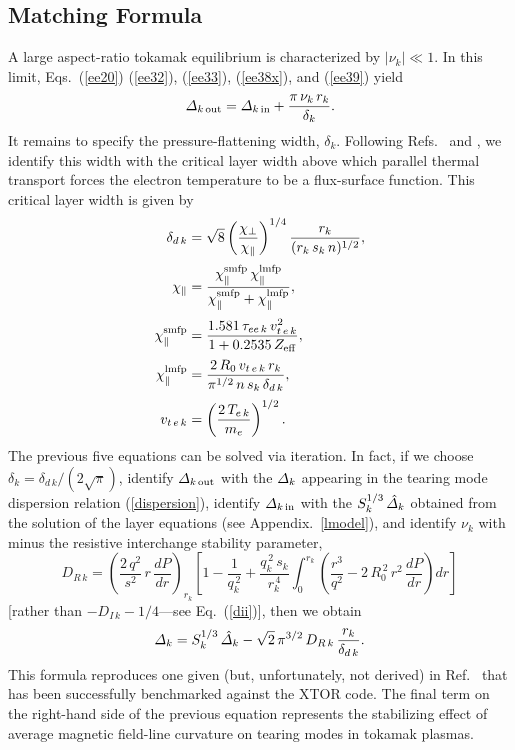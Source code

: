 \documentclass[12pt,prb,aps]{revtex4-1}
\begin{document}
\subsection{Matching Formula}
A large aspect-ratio tokamak equilibrium is characterized by $|\nu_k|\ll 1$. In this limit, Eqs.~(\ref{ee20}) (\ref{ee32}), (\ref{ee33}), (\ref{ee38x}), and (\ref{ee39}) yield
\begin{equation}
 {\mit\Delta}_{k\,{\rm out}} = {\mit\Delta}_{k\,{\rm in}}+ \frac{\pi\,\nu_k\,r_k}{\delta_k}.
 \end{equation}
It remains to specify the pressure-flattening width, $\delta_k$. Following Refs.~ and , we identify this width with the critical layer width above
which parallel thermal transport forces the electron temperature to be a flux-surface function. This critical layer width is given by\,\cite{hel,hel1}
\begin{align}
\delta_{d\,k}&= \sqrt{8}\left(\frac{\chi_\perp}{\chi_\parallel}\right)^{1/4}
\frac{r_k}{(r_k\,s_k\,n)^{1/2}},\\[0.5ex]
\chi_\parallel &= \frac{\chi_\parallel^{\rm smfp} \,\chi_\parallel^{\rm lmfp}}{\chi_\parallel^{\rm smfp}+\chi_\parallel^{\rm lmfp}},\\[0.5ex]
\chi_\parallel^{\rm smfp} &= \frac{1.581\,\tau_{ee\,k}\,v_{t\,e\,k}^2}{1+ 0.2535\,Z_{\rm eff}},\\[0.5ex]
\chi_\parallel^{\rm lmfp}&= \frac{2\,R_0\,v_{t\,e\,k}\,r_k}{\pi^{1/2}\,n\,s_k\,\delta_{d\,k}},\\[0.5ex]
v_{t\,e\,k} &= \left(\frac{2\,T_{e\,k}}{m_e}\right)^{1/2}.
\end{align}
The previous five equations can be solved via iteration. In fact, if we choose $\delta_k= \delta_{d\,k}/(2\sqrt{\pi})$, identify ${\mit\Delta}_{k\,{\rm out}}$ with the
${\mit\Delta}_k$ appearing in the tearing mode dispersion relation (\ref{dispersion}), identify ${\mit\Delta}_{k\,{\rm in}}$ with the $S_k^{1/3}\,\hat{\mit\Delta}_k$
obtained from the solution of the layer equations (see Appendix.~\ref{lmodel}), and identify $\nu_k$ with minus the resistive interchange stability parameter,\cite{ggj,ggj1}
\begin{equation}
D_{R\,k} = \left(\frac{2\,q^2}{s^2}\,r\,\frac{dP}{dr}\right)_{r_k}\left[1-\frac{1}{q_k^{\,2}}+ \frac{q_k^{\,2}\,s_k}{r_k^{\,4}}\int_0^{r_k}
\left(\frac{r^3}{q^2} -2\,R_0^{\,2}\,r^2\,\frac{dP}{dr}\right)dr\right]
\end{equation}
 [rather than $-D_{I\,k}-1/4$---see Eq.~(\ref{dii})],\cite{kot}
then we obtain
\begin{equation}
{\mit\Delta}_k = S_k^{1/3}\,\hat{\mit\Delta}_k - \sqrt{2}\,\pi^{3/2}\,D_{R\,k}\,\frac{r_k}{\delta_{d\,k}}.
\end{equation}
This formula reproduces one given (but, unfortunately,  not derived) in Ref.~ that has been successfully benchmarked against the XTOR code. The final term on the right-hand side
of the previous equation represents the stabilizing effect of average magnetic field-line curvature on tearing modes in tokamak plasmas. 
\end{document}
